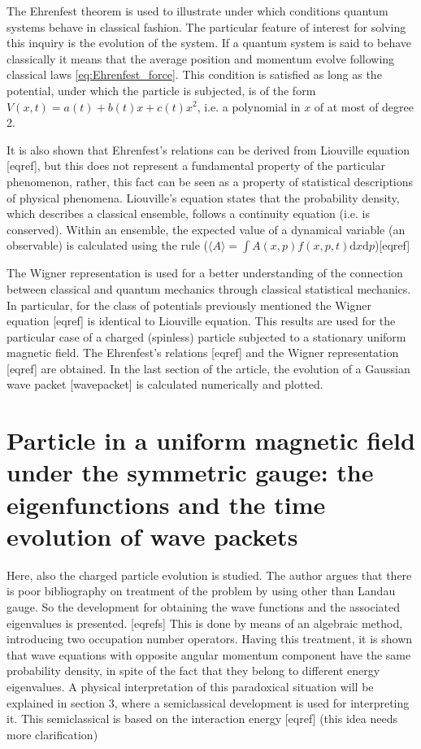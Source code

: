 The Ehrenfest theorem is used to illustrate under which conditions quantum systems behave in classical fashion. The particular feature of interest for solving this inquiry is the evolution of the system. If a quantum system is said to behave classically it means that the average position and momentum evolve following classical laws \eqref{eq:Ehrenfest_force}. This condition is satisfied as long as the potential, under which the particle is subjected, is of the form $V(x, t) = a(t) + b(t)x + c(t)x^2$, i.e. a polynomial in $x$ of at most of degree 2.

It is also shown that Ehrenfest’s relations can be derived from Liouville equation [eqref], but this does not represent a fundamental property of the particular phenomenon, rather, this fact can be seen as a property of statistical descriptions of physical phenomena. Liouville's equation states that the probability density, which describes a classical ensemble, follows a continuity equation (i.e. is conserved). Within an ensemble, the expected value of a dynamical variable (an observable) is calculated using the rule ($\langle A \rangle = \int A (x, p) f(x, p, t)\text{d}x\text{d}p$)[eqref]

The Wigner representation is used for a better understanding of the connection between classical and quantum mechanics through classical statistical mechanics. In particular, for the class of potentials previously mentioned the Wigner equation [eqref] is identical to Liouville equation. This results are used for the particular case of a charged (spinless) particle subjected to a stationary uniform magnetic field. The Ehrenfest’s relations [eqref] and the Wigner representation [eqref] are obtained. In the last section of the article, the evolution of a Gaussian wave packet [wavepacket] is calculated numerically and plotted.

\section*{Particle in a uniform magnetic field under the symmetric gauge: the eigenfunctions and the time evolution of wave packets \cite{britoParticleUniformMagnetic2007}}

Here, also the charged particle evolution is studied. The author argues that there is poor bibliography on treatment of the problem by using other than Landau gauge. So the development for obtaining the wave functions and the associated eigenvalues is presented. [eqrefs] This is done by means of an algebraic method, introducing two occupation number operators. Having this treatment, it is shown that wave equations with opposite angular momentum component have the same probability density, in spite of the fact that they belong to different energy eigenvalues. A physical interpretation of this paradoxical situation will be explained in section 3, where a semiclassical development is used for interpreting it. This semiclassical is based on the interaction energy [eqref] (this idea needs more clarification)

